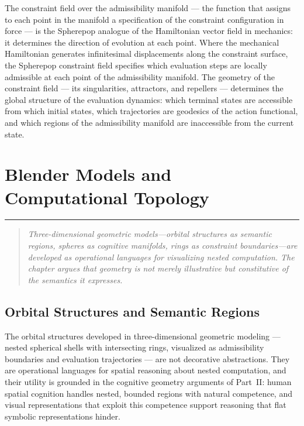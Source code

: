 \documentclass[12pt,openany]{book}
\theoremstyle{plain}
\theoremstyle{definition}
\theoremstyle{remark}
\newcommand{\chapterrule}{%
  \vspace{4pt}%
  {\color{SpherepopBlue}\rule{\textwidth}{0.8pt}}%
  \vspace{10pt}%
}
\newenvironment{chapterprecis}{%
  \begin{quote}\small\itshape}{%
  \end{quote}\medskip}
\begin{document}
The constraint field over the admissibility manifold — the function that assigns to each point in the manifold a specification of the constraint configuration in force — is the Spherepop analogue of the Hamiltonian vector field in mechanics: it determines the direction of evolution at each point. Where the mechanical Hamiltonian generates infinitesimal displacements along the constraint surface, the Spherepop constraint field specifies which evaluation steps are locally admissible at each point of the admissibility manifold. The geometry of the constraint field — its singularities, attractors, and repellers — determines the global structure of the evaluation dynamics: which terminal states are accessible from which initial states, which trajectories are geodesics of the action functional, and which regions of the admissibility manifold are inaccessible from the current state.

\chapter{Blender Models and Computational Topology}
\chapterrule

\begin{chapterprecis}
Three-dimensional geometric models---orbital structures as
semantic regions, spheres as cognitive manifolds, rings as
constraint boundaries---are developed as operational languages
for visualizing nested computation. The chapter argues that
geometry is not merely illustrative but constitutive of the
semantics it expresses.
\end{chapterprecis}

\section{Orbital Structures and Semantic Regions}

The orbital structures developed in three-dimensional geometric modeling — nested spherical shells with intersecting rings, visualized as admissibility boundaries and evaluation trajectories — are not decorative abstractions. They are operational languages for spatial reasoning about nested computation, and their utility is grounded in the cognitive geometry arguments of Part~II: human spatial cognition handles nested, bounded regions with natural competence, and visual representations that exploit this competence support reasoning that flat symbolic representations hinder.
\end{document}
